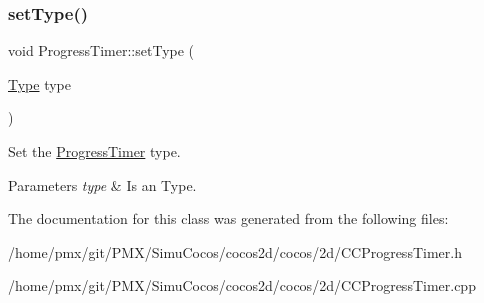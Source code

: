 \subsubsection{\texorpdfstring{set\+Type()}{setType()}\hspace{0.1cm}{\footnotesize\ttfamily [2/2]}}
{\footnotesize\ttfamily void Progress\+Timer\+::set\+Type (\begin{DoxyParamCaption}\item[{\hyperlink{classProgressTimer_a9638d092b86d51bce727621b1a70d32f}{Type}}]{type }\end{DoxyParamCaption})}

Set the \hyperlink{classProgressTimer}{Progress\+Timer} type.


\begin{DoxyParams}{Parameters}
{\em type} & Is an Type. \\
\hline
\end{DoxyParams}


The documentation for this class was generated from the following files\+:\begin{DoxyCompactItemize}
\item 
/home/pmx/git/\+P\+M\+X/\+Simu\+Cocos/cocos2d/cocos/2d/C\+C\+Progress\+Timer.\+h\item 
/home/pmx/git/\+P\+M\+X/\+Simu\+Cocos/cocos2d/cocos/2d/C\+C\+Progress\+Timer.\+cpp\end{DoxyCompactItemize}
